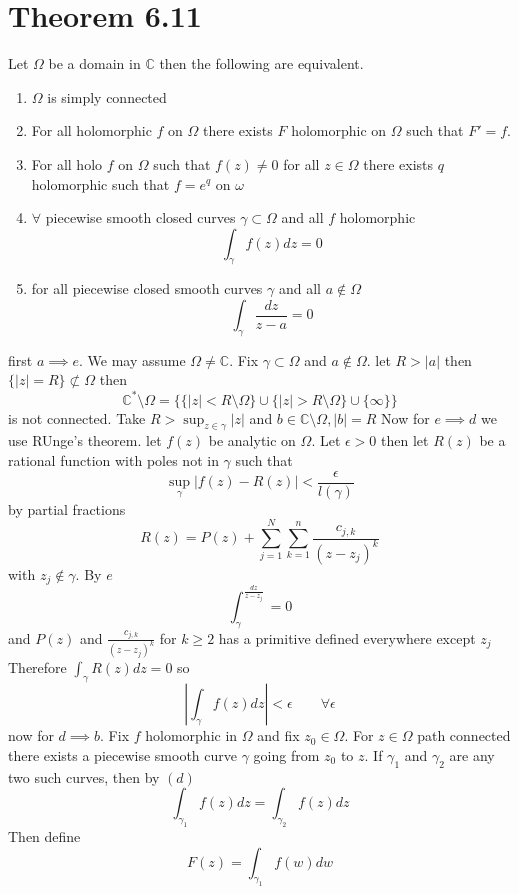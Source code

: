 \documentclass[11pt]{article}
\begin{document}
\section{Theorem 6.11}
Let $\Omega$ be a domain in  $ \mathbb{C}$ then the following are equivalent.
\begin{enumerate}
    \item $\Omega$ is simply connected
    \item For all holomorphic  $f$ on $\Omega$ there exists  $F$ holomorphic on  $\Omega$ such that  $F' = f$.
    \item For all holo  $f$ on $\Omega$ such that  $f(z) \ne 0$ for all  $z \in \Omega$ there exists  $q$ holomorphic such that  $f = e^{q}$ on $\omega$
    \item  $\forall $ piecewise smooth closed curves  $\gamma \subset \Omega$ and all $f$ holomorphic
        \[
        \int_{\gamma}^{}f(z) dz = 0
        \] 
    \item for all piecewise closed smooth curves $\gamma$ and all $a \not\in \Omega$
         \[
        \int_{\gamma}^{}\frac{dz}{z-a} = 0
        \] 
\end{enumerate}
first $a \implies e$. We may assume  $\Omega \ne \mathbb{C}$. Fix $\gamma \subset \Omega$ and $a \not\in \Omega$. let  $R > |a|$
then  $\{|z| = R\} \not\subset \Omega$ then 
\[
    \mathbb{C}^{*} \setminus \Omega = \{\{|z| < R \setminus \Omega\} \cup \{ |z| > R \setminus \Omega\} \cup \{\infty\}\}
\] 
is not connected. Take $ R > \sup_{z \in \gamma} |z|$ and $b \in \mathbb{C} \setminus \Omega, |b| = R$
Now for $e \implies d$ we use RUnge's theorem.
let  $f(z)$ be analytic on  $\Omega$. Let  $\epsilon >0$ then let $R(z)$ be a rational function with poles not in  $\gamma$ such that
\[
    \sup_{\gamma} |f(z) - R(z)| < \frac{\epsilon}{l(\gamma)}
\] 
by partial fractions
\[
    R(z) = P(z) + \sum_{j=1}^{N}\sum_{k=1}^{n} \frac{c_{j,k}}{(z-z_j)^{k}}
\] 
with $z_j \not\in \gamma$.
By  $e$ 
 \[
\int_{\gamma}^{\frac{dz}{z-z_j}} = 0
\] 
and $P(z)$ and  $\frac{c_{j,k}}{(z-z_j)^{k}}$ for $k \ge 2$ has a primitive defined everywhere except $z_j$
Therefore $\int_{\gamma}^{}R(z)dz = 0$ so
\[
|\int_{\gamma}^{}f(z)dz| < \epsilon \qquad \forall \epsilon
\] 
now for $d \implies b$.
Fix  $f $ holomorphic in $\Omega$ and fix  $z_0 \in \Omega$. For $z \in \Omega$ path connected there exists a piecewise smooth curve $\gamma$ going from $z_0 $ to $z$.
If $\gamma_1$ and $\gamma_2$ are any two such curves, then by $(d)$ 
 \[
\int_{\gamma_1}^{}f(z)dz = \int_{\gamma_2}^{}f(z) dz
\] 
Then define
\[
F(z) = \int_{\gamma_1}^{}f(w)dw
\] 
\end{document}
